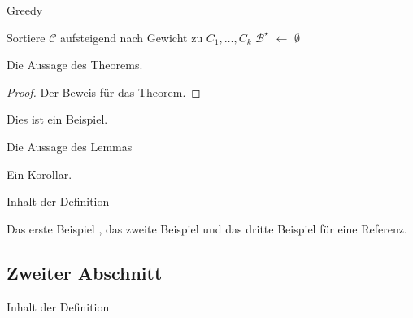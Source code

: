 \documentclass[a4paper,ngerman]{atseminar}
\begin{document}
\begin{algorithm}[H]
\caption{Greedy}
Sortiere $\mathcal{C}$ aufsteigend nach Gewicht zu $C_1,\ldots,C_k$\; 
$\mathcal{B}^\star$ $\leftarrow$ $\emptyset$\; %
\end{algorithm}

\begin{theorem}
 Die Aussage des Theorems.
\end{theorem}

\begin{proof}
 Der Beweis für das Theorem.
\end{proof}

\begin{example}
 Dies ist ein Beispiel.
\end{example}


\begin{lemma}
 Die Aussage des Lemmas
\end{lemma}

\begin{corollary}
 Ein Korollar.
\end{corollary}


\begin{definition}
Inhalt der Definition
\end{definition}

Das erste Beispiel \cite{example1}, das zweite Beispiel
\cite{example2} und  das dritte Beispiel \cite{example3, example4}
für eine Referenz.

\subsection{Zweiter Abschnitt}


\begin{definition}
Inhalt der Definition
\end{definition}









\end{document}
